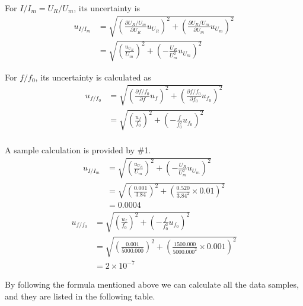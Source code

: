 \documentclass[a4paper]{article}
\begin{document}
For $I/I_m = U_R/U_m$, its uncertainty is
\begin{align*}
	u_{I/I_m}
	 & = \sqrt{(\frac{\partial U_R/U_m}{\partial U_R}u_{U_R})^2 + (\frac{\partial U_R/U_m}{\partial U_m}u_{U_m})^2} \\
	 & = \sqrt{(\frac{u_{U_R}}{U_m})^2 + (-\frac{U_R}{U_m^2}u_{U_m})^2}
\end{align*}

For $f/f_0$, its uncertainty is calculated as
\begin{align*}
	u_{f/f_0}
	 & = \sqrt{(\frac{\partial f/f_0}{\partial f}u_f)^2 + (\frac{\partial f/f_0}{\partial f_0}u_{f_0})^2} \\
	 & = \sqrt{(\frac{u_f}{f_0})^2 + (-\frac{f}{f_0^2}u_{f_0})^2}                                         \\
\end{align*}

A sample calculation is provided by $\#$1.
\begin{align*}
	u_{I/I_m}
	 & = \sqrt{(\frac{u_{U_R}}{U_m})^2 + (-\frac{U_R}{U_m^2}u_{U_m})^2}      \\
	 & = \sqrt{(\frac{0.001}{3.84})^2 + (\frac{0.520}{3.84^2}\times 0.01)^2} \\
	 & = 0.0004
\end{align*}
\begin{align*}
	u_{f/f_0}
	 & = \sqrt{(\frac{u_f}{f_0})^2 + (-\frac{f}{f_0^2}u_{f_0})^2}                        \\
	 & = \sqrt{(\frac{0.001}{5000.000})^2 + (\frac{1500.000}{5000.000^2}\times 0.001)^2} \\
	 & = 2\times 10^{-7}
\end{align*}

By following the formula mentioned above we can calculate all the data samples, and they are listed in the following table.
\end{document}
